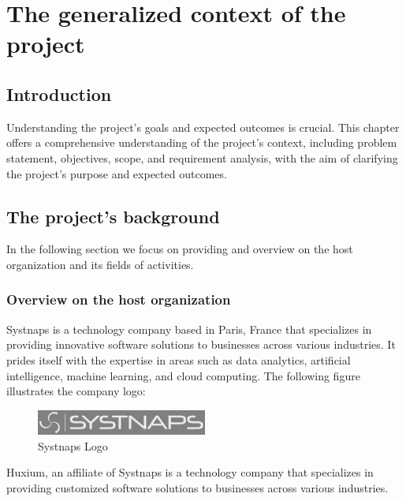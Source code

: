 \graphicspath{{./assets/}}
\setcounter{mtc}{1}
\chapter{The generalized context of the project }


\section*{Introduction}

\hspace{7mm}Understanding the project's goals and expected outcomes is crucial. This chapter offers a comprehensive understanding of the project's context, including problem statement, objectives, scope, and requirement analysis, with the aim of clarifying the project's purpose and expected outcomes.

\section{The project's background}
\hspace{7mm}In the following section we focus on providing and overview on the host organization and its fields of activities. 
\subsection{Overview on the host organization  }

\hspace{7mm}Systnaps is a technology company based in Paris, France that specializes in providing innovative software solutions to businesses across various industries. It prides itself with the expertise in areas such as data analytics, artificial intelligence, machine learning, and cloud computing. The following figure illustrates the company logo: 

\begin{figure}[!ht]\centering
\includegraphics[width=0.5\textwidth,angle=00]{assets/fa.png}
\caption{Systnaps Logo}
\end{figure}

\hspace{7mm}Huxium, an affiliate of Systnaps is a technology company that specializes in providing customized software solutions to businesses across various industries. 


